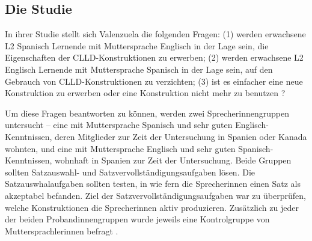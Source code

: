 \subsection{Die Studie}
In ihrer Studie stellt sich Valenzuela die folgenden Fragen:
(1) werden erwachsene L2 Spanisch Lernende mit Muttersprache Englisch in der Lage sein, die Eigenschaften der CLLD-Konstruktionen zu erwerben;
(2) werden erwachsene L2 Englisch Lernende mit Muttersprache Spanisch in der Lage sein, auf den Gebrauch von CLLD-Konstruktionen zu verzichten;
(3) ist es einfacher eine neue Konstruktion zu erwerben oder eine Konstruktion nicht mehr zu benutzen \cite{Valenzuela05}?


Um diese Fragen beantworten zu können, werden zwei Sprecherinnengruppen untersucht --
eine mit Muttersprache Spanisch und sehr guten Englisch-Kenntnissen, deren Mitglieder zur Zeit der Untersuchung in Spanien oder Kanada wohnten,
und eine mit Muttersprache Englisch und sehr guten Spanisch-Kenntnissen, wohnhaft in Spanien zur Zeit der Untersuchung.
Beide Gruppen sollten Satzauswahl- und Satzvervollständigungsaufgaben lösen.
Die Satzauswhalaufgaben sollten testen, in wie fern die Sprecherinnen einen Satz als akzeptabel befanden.
Ziel der Satzvervollständigungsaufgaben war zu überprüfen, welche Konstruktionen die Sprecherinnen aktiv produzieren.
Zusätzlich zu jeder der beiden Probandinnengruppen wurde jeweils eine Kontrolgruppe von Muttersprachlerinnen befragt \cite{Valenzuela05}.


